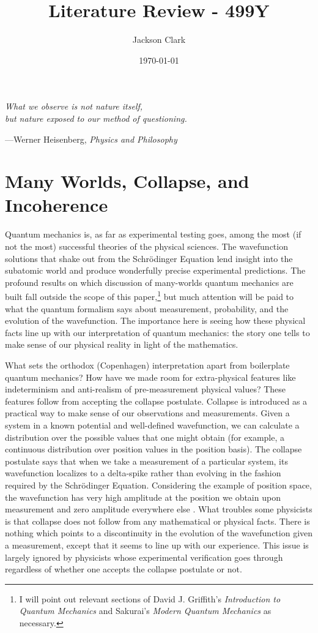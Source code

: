 \documentclass{article}
\author{Jackson Clark}
\title{Literature Review - 499Y}
\date{\today}
\begin{document}
\maketitle

\epigraph{\itshape What we observe is not nature itself,\\
but nature exposed to our method of questioning.}{---Werner Heisenberg, \textit{Physics and Philosophy}}

\section{Many Worlds, Collapse, and Incoherence}
Quantum mechanics is, as far as experimental testing goes, among the most (if not the most) successful theories of the physical sciences. The wavefunction solutions that shake out from the Schrödinger Equation lend insight into the subatomic world and produce wonderfully precise experimental predictions. The profound results on which discussion of many-worlds quantum mechanics are built fall outside the scope of this paper,\footnote{I will point out relevant sections of David J. Griffith’s \emph{Introduction to Quantum Mechanics} and Sakurai’s \emph{Modern Quantum Mechanics} as necessary.} but much attention will be paid to what the quantum formalism says about measurement, probability, and the evolution of the wavefunction. The importance here is seeing how these physical facts line up with our interpretation of quantum mechanics: the story one tells to make sense of our physical reality in light of the mathematics.

What sets the orthodox (Copenhagen) interpretation apart from boilerplate quantum mechanics? How have we made room for extra-physical features like indeterminism and anti-realism of pre-measurement physical values? These features follow from accepting the collapse postulate. Collapse is introduced as a practical way to make sense of our observations and measurements. Given a system in a known potential and well-defined wavefunction, we can calculate a distribution over the possible values that one might obtain (for example, a continuous distribution over position values in the position basis). The collapse postulate says that when we take a measurement of a particular system, its wavefunction localizes to a delta-spike rather than evolving in the fashion required by the Schrödinger Equation. Considering the example of position space, the wavefunction has very high amplitude at the position we obtain upon measurement and zero amplitude everywhere else \parencite[6]{griffithsIntroductionQuantumMechanics2018}. What troubles some physicists is that collapse does not follow from any mathematical or physical facts. There is nothing which points to a discontinuity in the evolution of the wavefunction given a measurement, except that it seems to line up with our experience. This issue is largely ignored by physicists whose experimental verification goes through regardless of whether one accepts the collapse postulate or not.
\end{document}
